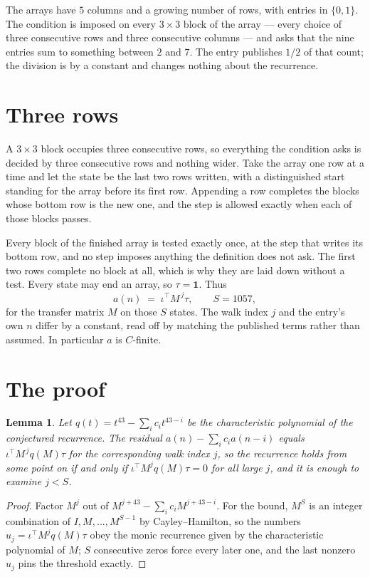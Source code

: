 \documentclass[11pt,a4paper]{article}
\theoremstyle{plain}
\newtheorem{lemma}[theorem]{Lemma}
\theoremstyle{definition}
\begin{document}
The arrays have $5$ columns and a growing number of rows, with entries in $\{0,1\}$. The
condition is imposed on every $3\times3$ block of the array --- every choice of three
consecutive rows and three consecutive columns --- and asks that the nine entries sum to something between $2$ and $7$. The entry publishes $1/2$ of that count; the division is by a constant and changes nothing about the recurrence.



\section{Three rows}

A $3\times3$ block occupies three consecutive rows, so everything the condition asks is decided
by three consecutive rows and nothing wider. Take the array one row at a time and let the state
be the last two rows written, with a distinguished start standing for the array before its
first row. Appending a row completes the blocks whose bottom row is the new one, and the step
is allowed exactly when each of those blocks passes.

Every block of the finished array is tested exactly once, at the step that writes its bottom
row, and no step imposes anything the definition does not ask. The first two rows complete no
block at all, which is why they are laid down without a test. Every state may end an array, so
$\tau=\mathbf{1}$. Thus
\[
a(n)\;=\;\iota^{\!\top}M^{\,j}\tau ,\qquad S=1057,
\]
for the transfer matrix $M$ on those $S$ states. The walk index $j$ and the entry's own $n$
differ by a constant, read off by matching the published terms rather than assumed. In
particular $a$ is $C$-finite.

\section{The proof}

\begin{lemma}\label{lem:crit}
Let $q(t)=t^{43}-\sum_i c_it^{43-i}$ be the characteristic polynomial of the
conjectured recurrence. The residual $a(n)-\sum_ic_ia(n-i)$ equals
$\iota^{\!\top}M^{\,j}q(M)\tau$ for the corresponding walk index $j$, so the recurrence
holds from some point on if and only if $\iota^{\!\top}M^{j}q(M)\tau=0$ for all large $j$,
and it is enough to examine $j<S$.
\end{lemma}

\begin{proof}
Factor $M^{j}$ out of $M^{j+43}-\sum_ic_iM^{j+43-i}$. For the bound, $M^{S}$
is an integer combination of $I,M,\dots,M^{S-1}$ by Cayley--Hamilton, so the numbers
$u_j=\iota^{\!\top}M^{j}q(M)\tau$ obey the monic recurrence given by the characteristic
polynomial of $M$; $S$ consecutive zeros force every later one, and the last nonzero $u_j$
pins the threshold exactly.
\end{proof}
\end{document}
